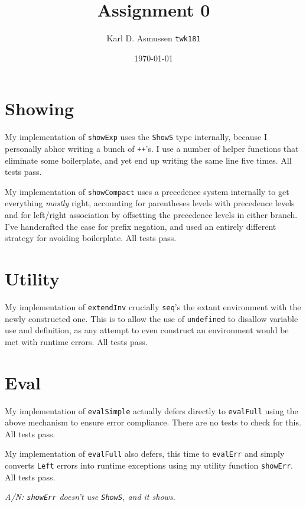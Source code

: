 \documentclass[a4paper,article,oneside,10pt,twocolumn]{memoir}
\title{Assignment 0}
\author{Karl D. Asmussen \texttt{twk181}}
\date{\protect\today}
\begin{document}
\maketitle\thispagestyle{fancy}


\section{Showing}

My implementation of \lstinline{showExp} uses the \lstinline{ShowS} type internally,
because I personally abhor writing a bunch of \lstinline{++}'s. I use a number of helper functions
that eliminate some boilerplate, and yet end up writing the same line five times. All tests pass.

My implementation of \lstinline{showCompact} uses a precedence system internally
to get everything \emph{mostly} right, accounting for parentheses levels with precedence levels
and for left/right association by offsetting the precedence levels in either branch. I've
handcrafted the case for prefix negation, and used an entirely different strategy for
avoiding boilerplate. All tests pass.

\section{Utility}

My implementation of \lstinline{extendInv} crucially \lstinline{seq}'s the
extant environment with the newly constructed one. This is to allow the use
of \lstinline{undefined} to disallow variable use and definition, as any attempt
to even construct an environment would be met with runtime errors. All tests pass.

\section{Eval}

My implementation of \lstinline{evalSimple} actually defers directly
to \lstinline{evalFull} using the above mechanism to ensure error compliance. There
are no tests to check for this. All tests pass.

My implementation of \lstinline{evalFull} also defers, this time to
\lstinline{evalErr} and simply converts \lstinline{Left} errors into runtime
exceptions using my utility function \lstinline{showErr}.
All tests pass.

\textit{A/N: \lstinline{showErr} doesn't use \lstinline{ShowS}, and it shows.}
\end{document}
